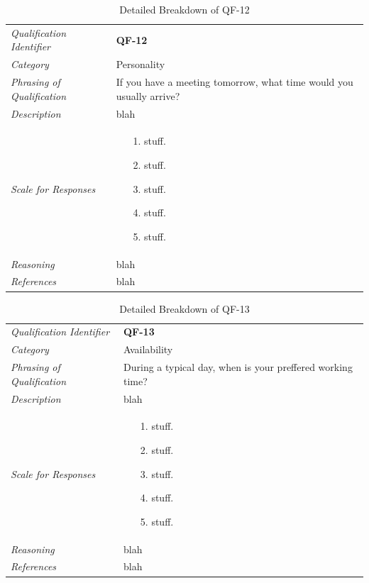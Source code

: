 \documentclass[12pt,letterpaper]{article}
\begin{document}
\begin{table}[H]
	\caption{Detailed Breakdown of QF-12}
	\begin{tabu} to 
		\toprule
		Qualification Identifier & {\bf QF-12}\\
		Category & Personality \\
		Phrasing of Qualification & If you have a meeting tomorrow, what time would you usually arrive? \\
		Description & blah\\
		Scale for Responses &
		\begin{minipage}[t]{\linewidth}
			\begin{enumerate}
				\item[1.] stuff.
				\item[2.] stuff.
				\item[3.] stuff.
				\item[4.] stuff.
				\item[5.] stuff.
			\end{enumerate}
		\end{minipage}\\
		Reasoning & blah\\
		References & blah\\
		\toprule
	\end{tabu}
\end{table}

\begin{table}[H]
	\caption{Detailed Breakdown of QF-13}
	\begin{tabu} to 
		\toprule
		Qualification Identifier & {\bf QF-13}\\
		Category & Availability \\
		Phrasing of Qualification & During a typical day, when is your preffered working time? \\
		Description & blah\\
		Scale for Responses &
		\begin{minipage}[t]{\linewidth}
			\begin{enumerate}
				\item[1.] stuff.
				\item[2.] stuff.
				\item[3.] stuff.
				\item[4.] stuff.
				\item[5.] stuff.
			\end{enumerate}
		\end{minipage}\\
		Reasoning & blah\\
		References & blah\\
		\toprule
	\end{tabu}
\end{table}
\end{document}

